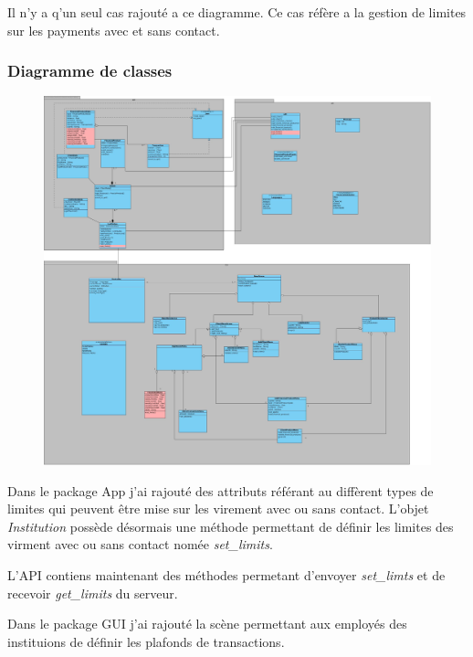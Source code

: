 \documentclass[../rapport.tex]{subfiles}
\begin{document}
        Il n'y a q'un seul cas rajouté a ce diagramme. Ce cas réfère a la gestion de limites sur les payments avec et sans contact.

		\subsubsection{Diagramme de classes}

				\begin{figure}[h]
						\centering\includegraphics[scale=0.15]{ressources/photos_diagrammes/extensionChristian/classapp2/ClassDiagram.jpg}
				\end{figure}
		Dans le package App j'ai rajouté des attributs référant au diffèrent types de limites qui peuvent être mise sur les virement avec ou sans contact.
        L'objet \textit{Institution} possède désormais une méthode permettant de définir les limites des virment avec ou sans contact nomée \textit{set\_limits}.

		\bigskip

		L'API contiens maintenant des méthodes permetant d'envoyer \textit{set\_limts} et de recevoir \textit{get\_limits}
        du serveur.

		\bigskip

        Dans le package GUI j'ai rajouté la scène permettant aux employés des instituions de définir les plafonds de transactions.
		\medskip
\end{document}
